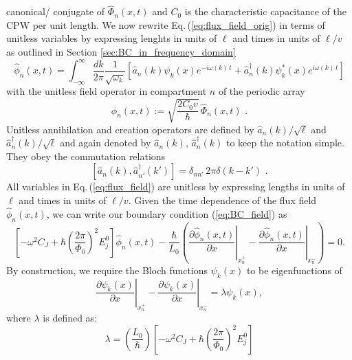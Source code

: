 canonical/ conjugate of $\hat{\Phi}_n(x,t)$ and $C_0$ is the characteristic capacitance of the CPW per unit length. 
%
We now rewrite Eq.\,(\ref{eq:flux_field_orig}) in terms of unitless variables 
by expressing lenghts in units of $\ell$ and times in units of $\ell/v$
as outlined in Section \ref{sec:BC_in_frequency_domain}  
%
\begin{equation} \label{eq:flux_field}
    \hat{\phi}_n(x,t) = 
    \int_{-\infty}^{\infty}\frac{dk}{2 \pi} \frac{1}{\sqrt{\omega_k}}
    \left[ \hat{a}_n(k) \psi_k(x)e^{-i \omega(k) \, t} + 
    \hat{a}_n^{\dagger}(k) \psi_k^*(x) e^{i \omega(k) \, t} \right]
\end{equation}
%
with the unitless field operator in compartment $n$ of the periodic array
%
\begin{equation} \label{eq:ufo}
\hat{\phi}_n(x,t) := \sqrt{\frac{2 C_0 v}{\hbar}} \, \hat{\Phi}_n(x,t) \, \, .
\end{equation}
%
Unitless annihilation and creation operators are defined by $\hat{a}_n(k)/\sqrt{\ell}$ 
and ${\hat a}_{n}^\dagger(k) / \sqrt{\ell}$ and again denoted by
$\hat{a}_n(k)$, ${\hat a}_{n}^\dagger(k)$ to keep the notation simple. 
They obey the commutation relations 
%
\begin{equation} \label{eq:cra}
    \left[ \hat{a}_n(k),{\hat a}_{n'}^\dagger(k') \right] = \delta_{nn'} \, 2 \pi \delta(k - k') \, \, .
\end{equation}
%
All variables in Eq.\,(\ref{eq:flux_field}) are unitless by expressing lengths in units of $\ell$
and times in units of $\ell/v$.
%
\color{black}
%
%
Given the time dependence of the flux field $\hat{\phi}_n(x,t)$, we can write our boundary condition (\ref{eq:BC_field}) as
%
\begin{equation}
\left[-\omega^2 C_{J}+\hbar\left(\frac{2 \pi}{\Phi_{0}}\right)^{2} E_{j}^0\right]\hat{\phi}_n(x,t) -\frac{\hbar}{L_{0}}\left(\left.\frac{\partial \hat{\phi}_n(x,t)}{\partial x}\right|_{x_n^{+}}-\left.\frac{\partial \hat{\phi}_n(x,t)}{\partial x}\right|_{x_n^{-}}\right)=0.
\end{equation}
%
By construction, we require the Bloch functions $\psi_k(x)$ to be eigenfunctions of
%
\begin{equation}\label{eq:bloch_eigenvalproblem}
\left.\frac{\partial\psi_{k}(x)}{\partial x}\right|_{x_n^{+}}-\left.\frac{\partial\psi_{k}(x)}{\partial x}\right|_{x_n^{-}}=\lambda \psi_k(x),
\end{equation}
%
where $\lambda$ is defined as:
%
\begin{equation}
\lambda = \left(\frac{L_0}{\hbar}\right)  
\left[-\omega^2 C_{J}+\hbar\left(\frac{2 \pi}{\Phi_{0}}\right)^{2} E_{j}^0\right]
\end{equation}
